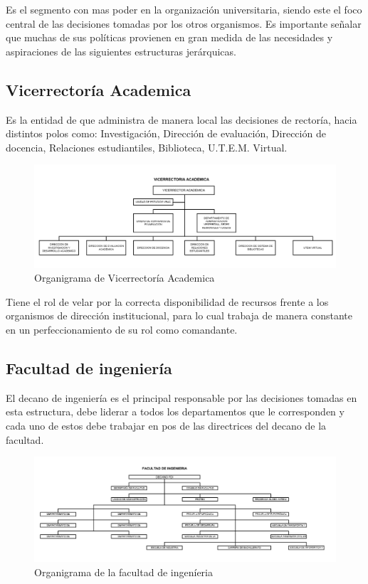 \documentclass[a4paper,12pt,openany,oneside]{book}
\begin{document}
Es el segmento con mas poder en la organización universitaria, siendo este el foco central de las decisiones tomadas por los otros organismos. Es importante señalar que muchas de sus políticas provienen en gran medida de las necesidades y aspiraciones de las siguientes estructuras jerárquicas.

\subsection{Vicerrectoría Academica}
Es la entidad de que administra de manera local las decisiones de rectoría, hacia distintos polos como: Investigación, Dirección de evaluación, Dirección de docencia, Relaciones estudiantiles, Biblioteca, U.T.E.M. Virtual.
\begin{figure}[!hbp]
\begin{center}
\includegraphics[scale=0.45,angle=0]{images/organigrama/2.png}
\caption{Organigrama de Vicerrector\'ia Academica}
\label{Organigrama de vicerrectoria Academica}
\end{center}
\end{figure}

Tiene el rol de velar por la correcta disponibilidad de recursos frente a los organismos de dirección institucional, para lo cual trabaja de manera constante en un perfeccionamiento de su rol como comandante.

\subsection{Facultad de ingeniería}
El decano de ingeniería es el principal responsable por las decisiones tomadas en esta estructura, debe liderar a todos los departamentos que le corresponden y cada uno de estos debe trabajar en pos de las directrices del decano de la facultad.
\begin{figure}[!hbp]
\begin{center}
\includegraphics[scale=0.45,angle=0]{images/organigrama/11.png}
\caption{Organigrama de la facultad de ingen\'ieria}
\label{Organigrama de la facultad de ingenieria}
\end{center}
\end{figure}
\end{document}
